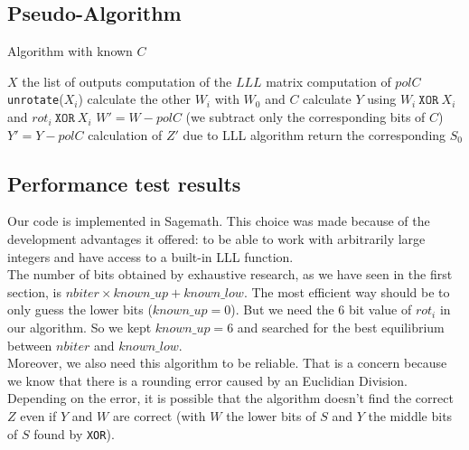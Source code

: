 \documentclass[preprint]{iacrtrans}
\begin{document}
\subsection{Pseudo-Algorithm}

\begin{algorithm}[h!]
\caption{Algorithm with known $C$}
\begin{algorithmic}
\REQUIRE $X$ the list of outputs
\STATE computation of the $LLL$ matrix
\STATE computation of $polC$
        \STATE \texttt{unrotate}($X_i$)
    \ENDFOR
        \STATE calculate the other $W_i$ with $W_0$ and $C$
        \STATE calculate $Y$ using $W_i\ \mathtt{XOR}\ X_i$ and $rot_i\ \mathtt{XOR}\ X_i$
        \STATE $W' = W - polC$ (we subtract only the corresponding bits of $C$)
        \STATE $Y' = Y - polC$
        \STATE calculation of $Z'$ due to LLL algorithm
                \STATE return the corresponding $S_0$
            \ENDIF
        \ENDIF
    \ENDFOR
\ENDFOR
\end{algorithmic}
\end{algorithm}
                
\subsection{Performance test results}
Our code is implemented in Sagemath. This choice was made because of the development advantages it offered: to be able to work with arbitrarily large integers and have access to a built-in LLL function.\\

The number of bits obtained by exhaustive research, as we have seen in the first section, is $nbiter \times known\_up + known\_low$. The most efficient way should be to only guess the lower bits ($known\_up = 0$). But we need the 6 bit value of $rot_i$ in our algorithm. So we kept $known\_up = 6$ and searched for the best equilibrium between $nbiter$ and $known\_low$. \\ 

Moreover, we also need this algorithm to be reliable. That is a concern because we know that there is a rounding error caused by an Euclidian Division. Depending on the error, it is possible that the algorithm doesn't find the correct $Z$ even if $Y$ and $W$ are correct (with $W$ the lower bits of $S$ and $Y$ the middle bits of $S$ found by \texttt{XOR}). \\
\end{document}
